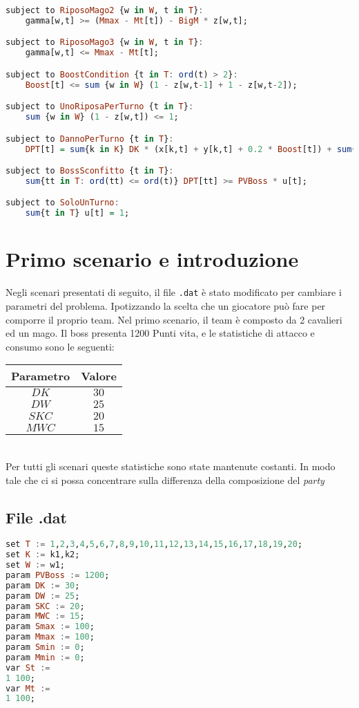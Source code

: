 \documentclass[12pt]{article}
\begin{document}
\begin{lstlisting}[language=haskell, frame=single, caption={Modello in Ampl}, captionpos=b, keywordstyle=\color{purple}]
subject to RiposoMago2 {w in W, t in T}:
    gamma[w,t] >= (Mmax - Mt[t]) - BigM * z[w,t];

subject to RiposoMago3 {w in W, t in T}:
    gamma[w,t] <= Mmax - Mt[t];

subject to BoostCondition {t in T: ord(t) > 2}:
    Boost[t] <= sum {w in W} (1 - z[w,t-1] + 1 - z[w,t-2]);

subject to UnoRiposaPerTurno {t in T}:
    sum {w in W} (1 - z[w,t]) <= 1;

subject to DannoPerTurno {t in T}:
    DPT[t] = sum{k in K} DK * (x[k,t] + y[k,t] + 0.2 * Boost[t]) + sum{w in W} z[w,t] * DW;

subject to BossSconfitto {t in T}:
    sum{tt in T: ord(tt) <= ord(t)} DPT[tt] >= PVBoss * u[t];

subject to SoloUnTurno:
    sum{t in T} u[t] = 1;
\end{lstlisting}

\section{Primo scenario e introduzione}
Negli scenari presentati di seguito, il file \texttt{.dat} è stato modificato per cambiare i parametri del problema. Ipotizzando la scelta che un giocatore può fare per comporre il proprio team.
Nel primo scenario, il team è composto da 2 cavalieri ed un mago. Il boss presenta 1200 Punti vita, e le statistiche di attacco e consumo sono le seguenti:
\begin{table}[h!]
    \centering
    \begin{tabular}{|c|c|}
        \hline
        \textbf{Parametro} & \textbf{Valore} \\
        \hline
        $DK$ & $30$ \\
        $DW$ & $25$ \\
        $SKC$ & $20$ \\
        $MWC$ & $15$ \\
        \hline
    \end{tabular}
\end{table}\\
Per tutti gli scenari queste statistiche sono state mantenute costanti. In modo tale che ci si possa concentrare sulla differenza della composizione del \textit{party}
\subsection{File .dat}
\begin{lstlisting}[language=haskell, frame=single, captionpos=b, keywordstyle=\color{purple}]  
set T := 1,2,3,4,5,6,7,8,9,10,11,12,13,14,15,16,17,18,19,20;
set K := k1,k2; 
set W := w1;
param PVBoss := 1200;
param DK := 30;
param DW := 25;
param SKC := 20;
param MWC := 15;    
param Smax := 100;
param Mmax := 100;
param Smin := 0;
param Mmin := 0;  
var St :=
1 100;
var Mt :=
1 100;
\end{lstlisting}
\end{document}
